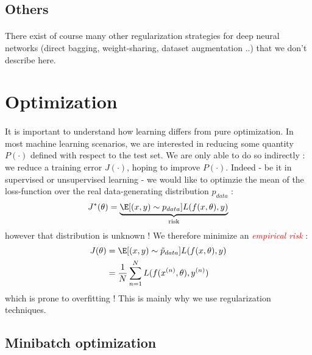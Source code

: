 \documentclass[a4paper]{article}
\begin{document}
{{			
		}
		\subsection{Others}
		{
			\paragraph{} There exist of course many other regularization strategies for deep neural networks (direct bagging, weight-sharing, dataset augmentation ..) that we don't describe here. 
		}
	}
	\section{Optimization}
	{
		\paragraph{} It is important to understand how learning differs from pure optimization. In most machine learning scenarios, we are interested in reducing some quantity $P(\cdot)$ defined with respect to the test set. We are only able to do so indirectly : we reduce a training error $J(\cdot)$, hoping to improve $P(\cdot)$. Indeed - be it in supervised or unsupervised learning - we would like to optimzie the mean of the loss-function over the real data-generating distribution $p_{data}$ : 
		\begin{equation}
			J^*(\theta) = \underbrace{\E[(x,y)\sim p_{data}]{L(f(x,\theta),y)}}_{\text{risk}}
		\end{equation}
		however that distribution is unknown ! We therefore minimize an \textcolor{red}{\emph{empirical risk}} : 
		\begin{equation}
			\begin{aligned}
				J(\theta) &= \E[(x,y)\sim \tilde{p}_{data}]{L(f(x,\theta),y)} \\
					      &= \frac{1}{N}\sum_{n=1}^N L(f(x^{(n)},\theta),y^{(n)})
			\end{aligned}
		\end{equation} 
		which is prone to overfitting ! This is mainly why we use regularization techniques. 
		
		\subsection{Minibatch optimization}
		{
}}
\end{document}
